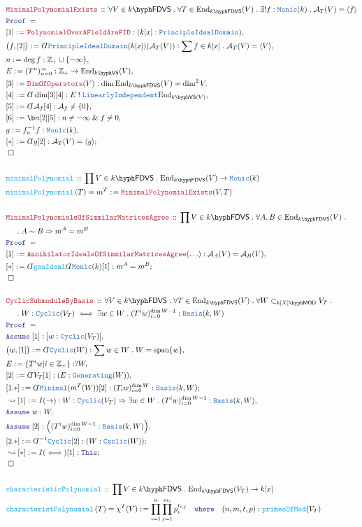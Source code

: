 \documentclass[12pt]{scrartcl}%
\newcommand{\TYPE}[1]{\textcolor{NavyBlue}{\mathtt{#1}}}%
\newcommand{\FUNC}[1]{\textcolor{Cerulean}{\mathtt{#1}}}%
\newcommand{\LOGIC}[1]{\textcolor{Blue}{\mathtt{#1}}}%
\newcommand{\THM}[1]{\textcolor{Maroon}{\mathtt{#1}}}%
\renewcommand{\.}{\; . \;} %
\newcommand{\de}{: \kern 0.1pc =} %
\newcommand{\where}{\LOGIC{where}} %
\newcommand{\IsNot}{\; ! \;} %
\newcommand{\Act}[1]{\left( #1 \right)} %
\newcommand{\Theorem}[2]{& \THM{#1} \, :: \, #2 \\ & \Proof = \\ } %
\newcommand{\DeclareFunc}[2]{& \FUNC{#1} \, :: \, #2 \\}%
\newcommand{\DefineNamedFunc}[4]{&  \FUNC{#1}\Act{#2} = #3 \de #4 \\}%
\newcommand{\NewLine}{\\ & \kern 1pc}%
\newcommand{\Page}[1]{ \begin{align*} #1 \end{align*}  }%
\newcommand{ \bd }{ \ByDef }%
\renewcommand{\And}{\; \& \;}%
\newcommand{\Int}{\mathbb{Z}}%
\newcommand{\End}{\mathrm{End}}%
\newcommand{\Say}[3]{& #1 \de #2 : #3, \\} %
\newcommand{\Conclude}[3]{& #1 \de #2 : #3; \\}%
\newcommand{\Derive}[3]{& \leadsto #1 \de #2 : #3, \\} %
\newcommand{\DeriveConclude}[3]{& \leadsto #1 \de #2 : #3 ; \\} %
\newcommand{\Assume}[2]{& \LOGIC{Assume} \; #1 : #2, \\} %
\newcommand{\QED}{\; \square} %
\newcommand{\EndProof}{& \QED \\} %
\newcommand{\ByDef}{\rotatebox[origin=c]{-180}{$D$}}%
\newcommand{\Proof}{\LOGIC{Proof} \; } %
\newcommand{\A}{\mathcal{A}}
\newcommand{\Basis}{\TYPE{Basis}} %
\newcommand{\submod}[1]{\subset_{\LMOD{#1}}}%
\newcommand{\LI}{\TYPE{LinearlyIndependent}}
\DeclareMathOperator{\Span}{span} %
\newcommand{\VS}[1]{#1\hyph\mathsf{VS}} %
\newcommand{\FDVS}[1]{#1\hyph\mathsf{FDVS}} %
\newcommand{\LMOD}[1]{#1\hyph\mathsf{MOD}} %
\newcommand{\PID}{\TYPE{PrincipleIdealDomain}}
\begin{document}
\Page{
	\Theorem{MinimalPolynomialExists}{\forall V \in \FDVS{k} \. \forall T \in \End_{\FDVS{k}}(V) \.  \exists! f : \TYPE{Monic}(k) \. \A_T(V) = \langle f \rangle  } 
	\Say{[1]}{\THM{PolynomialOverAFieldArePID}}{(k[x] : \PID)}
	\Say{\big(f ,[2] \big)}{ \bd \PID(k[x])(\A_T(V)) }{ \sum f \in k[x] \. \A_T(V) = \langle V \rangle}
	\Say{n}{\deg f}{\Int_+ \cup \{-\infty\}}
	\Say{E}{ (T^n)^\infty_{n=0}}{\Int_+ \to \End_{\VS{k}}(V)}
	\Say{[3]}{\THM{DimOfOperators}(V)}{\dim \End_{\FDVS{k}}(V) = \dim^2 V}
	\Say{[4]}{\bd \dim[3][4]}{ E \IsNot \LI{\End_{\VS{k}(V)}}}
	\Say{[5]}{\bd \A_f [4]}{\A_f \neq \{0\}}
	\Say{[6]}{ \b n [2][5]}{ n \neq -\infty \And f \neq 0}
	\Say{g}{f_n^{-1}f}{\TYPE{Monic}(k)}
	\Conclude{[*]}{\bd g [2]}{\A_T(V) = \langle g \rangle}
	\EndProof
	\\
	\DeclareFunc{minimalPolynomial}{\prod V \in \FDVS{k} \. \End_{\FDVS{k}}(V) \to \TYPE{Monic}(k)}
	\DefineNamedFunc{minimalPolynomial}{T}{m^T}{\THM{MinimalPolynomialExists}(V,T)}
	\\
	\Theorem{MinimalPolynomialsOfSimmilarMatricesAgree}{\prod V \in \FDVS{k} \. \forall A,B \in \End_{\FDVS{k}}(V) \. 
		\NewLine \. A \sim B \Rightarrow m^A = m^B}
	\Say{[1]}{\THM{AnnihilatorIdealsOfSimmilarMatricesAgree}(\ldots)}{\A_A(V) = \A_B(V)}
	\Conclude{[*]}{\bd \FUNC{genIdeal}\bd \TYPE{Monic}(k)[1]}{m^A = m^B}
	\EndProof
	\\
	\Theorem{CyclicSubmoduleByBasis}{\forall V \in \FDVS{k} \. \forall T \in\End_{\FDVS{k}}(V) \. \forall W \submod{k[X]} V_T \. \NewLine \.  
		W : \TYPE{Cyclic}(V_T) \iff \exists w \in W \. (T^iw)^{\dim W - 1}_{i=0} : \Basis(k,W) 	
	}
	\Assume{[1]}{[w : \TYPE{Cyclic}(V_T)]}
	\Say{\big(w,[1]\big)}{\bd \TYPE{Cyclic}(W)}{\sum w \in W \. W = \Span\{w\}}
	\Say{E}{\{ T^iw | i \in \Int_+ \}}{?W}
	\Say{[2]}{\bd V_T [1]}{(E : \TYPE{Generating}(W)) }
	\Conclude{[1.*]}{\bd \TYPE{Minimal}(m^T(W))[2]}{ (T_iw)^{\dim W}_{i=0} : \Basis(k,W)   }
	\Derive{[1]}{I(\rightarrow)}{W : \TYPE{Cyclic}(V_T) \Rightarrow \exists w \in W \. (T^i w)^{\dim W - 1}_{i=0} : \Basis(k,W)}
	\Assume{w}{W}
	\Assume{[2]}{\Big( (T^i w)_{i=0}^{\dim W - 1} : \Basis(k,W) \Big)}
	\Conclude{[2.*]}{\bd^{-1}\TYPE{Cyclic}[2]}{ (W : \TYPE{Ceclic}(W))  }
	\DeriveConclude{[*]}{I(\iff)[1]}{\LOGIC{This}} 
	\EndProof
	\\
	\DeclareFunc{characteristicPolynomial}{\prod V \in \FDVS{k} \. \End_{\FDVS{k}}(V_T) \to k[x] }
	\DefineNamedFunc{characteristPolynomial}{T}{\chi^T(V)}{  \prod^n_{i=1} \prod^{m_i}_{j=1} p_i^{t_{i,j}} \quad \where \quad (n,m,t,p) : \FUNC{primesOfMod}(V_T)  }
}
\end{document}
